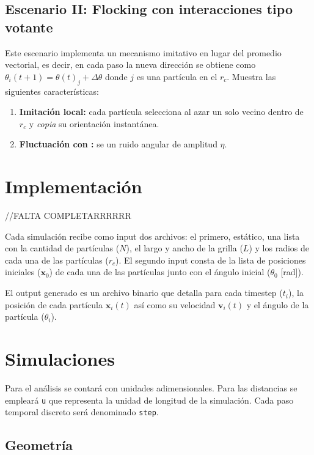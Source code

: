 \documentclass{article}
\begin{document}
\subsection{Escenario II: Flocking con interacciones tipo votante \cite{baglietto2018}}
Este escenario implementa un mecanismo imitativo en lugar del promedio vectorial, es decir, en cada paso la nueva dirección se obtiene como \(\theta_i(t+1)= \theta(t)_j + \Delta \theta\) donde \(j\) es una partícula en el \(r_c\). Muestra las siguientes características:
\begin{enumerate}
  \item \textbf{Imitación local:} cada partícula selecciona al azar un solo vecino dentro de \(r_c\) y \emph{copia} su orientación instantánea.
  \item \textbf{Fluctuación con :} se un ruido angular de amplitud \(\eta\).
\end{enumerate}

\section{Implementación}

//FALTA COMPLETARRRRRR

Cada simulación recibe como input dos archivos: el primero, estático, una lista con la cantidad de partículas (\( N\)), el largo y ancho de la grilla (\( L\)) y los radios de cada una de las partículas (\( r_c\)). El segundo input consta de la lista de posiciones iniciales (\(\mathbf x_0\)) de cada una de las partículas junto con el ángulo inicial (\( \theta_0\) [rad]).

El output generado es un archivo binario que detalla para cada timestep (\(t_i\)), la posición de cada partícula \(\mathbf x_i(t)\) así como su velocidad  \(\mathbf v_i(t)\) y el ángulo de la partícula (\( \theta_i\)).

\section{Simulaciones}
  
Para el análisis se contará con unidades adimensionales. Para las distancias se empleará \texttt{u} que representa la unidad de longitud de la simulación. Cada paso temporal discreto será denominado \texttt{step}.

\subsection{Geometría}
\end{document}
